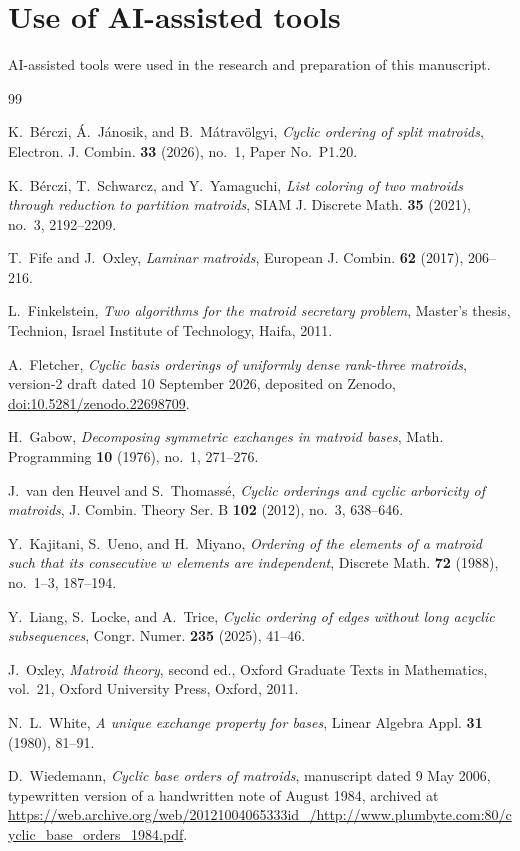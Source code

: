 \documentclass[11pt]{amsart}
\theoremstyle{definition}
\theoremstyle{remark}
\numberwithin{equation}{section}
\begin{document}
\section*{Use of AI-assisted tools}
AI-assisted tools were used in the research and preparation of this manuscript.

\begin{thebibliography}{99}

K.~B\'erczi, \'A.~J\'anosik, and B.~M\'atrav\"olgyi, \emph{Cyclic ordering of split matroids}, Electron. J. Combin. \textbf{33} (2026), no.~1, Paper No.~P1.20.

K.~B\'erczi, T.~Schwarcz, and Y.~Yamaguchi, \emph{List coloring of two matroids through reduction to partition matroids}, SIAM J. Discrete Math. \textbf{35} (2021), no.~3, 2192--2209.

T.~Fife and J.~Oxley, \emph{Laminar matroids}, European J. Combin. \textbf{62} (2017), 206--216.

L.~Finkelstein, \emph{Two algorithms for the matroid secretary problem}, Master's thesis, Technion, Israel Institute of Technology, Haifa, 2011.

A.~Fletcher, \emph{Cyclic basis orderings of uniformly dense rank-three matroids}, version-2 draft dated 10 September 2026, deposited on Zenodo, \href{https://doi.org/10.5281/zenodo.22698709}{doi:10.5281/zenodo.22698709}.

H.~Gabow, \emph{Decomposing symmetric exchanges in matroid bases}, Math. Programming \textbf{10} (1976), no.~1, 271--276.

J.~van den Heuvel and S.~Thomass\'e, \emph{Cyclic orderings and cyclic arboricity of matroids}, J. Combin. Theory Ser. B \textbf{102} (2012), no.~3, 638--646.

Y.~Kajitani, S.~Ueno, and H.~Miyano, \emph{Ordering of the elements of a matroid such that its consecutive $w$ elements are independent}, Discrete Math. \textbf{72} (1988), no.~1--3, 187--194.

Y.~Liang, S.~Locke, and A.~Trice, \emph{Cyclic ordering of edges without long acyclic subsequences}, Congr. Numer. \textbf{235} (2025), 41--46.

J.~Oxley, \emph{Matroid theory}, second ed., Oxford Graduate Texts in Mathematics, vol.~21, Oxford University Press, Oxford, 2011.

N.~L.~White, \emph{A unique exchange property for bases}, Linear Algebra Appl. \textbf{31} (1980), 81--91.

D.~Wiedemann, \emph{Cyclic base orders of matroids}, manuscript dated 9 May 2006, typewritten version of a handwritten note of August 1984, archived at \url{https://web.archive.org/web/20121004065333id_/http://www.plumbyte.com:80/cyclic_base_orders_1984.pdf}.

\end{thebibliography}
\end{document}
